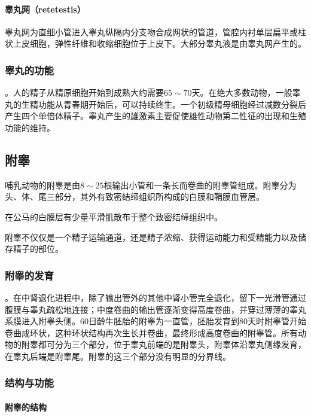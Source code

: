\paragraph{睾丸网（retetestis）}

睾丸网为直细小管进入睾丸纵隔内分支吻合成网状的管道，管腔内衬单层扁平或柱状上皮细胞，弹性纤维和收缩细胞位于上皮下。大部分睾丸液是由睾丸网产生的。

\subsubsection{睾丸的功能}

。人的精子从精原细胞开始到成熟大约需要$ 65\sim 70 $天。在绝大多数动物，一般睾丸的生精功能从青春期开始后，可以持续终生。一个初级精母细胞经过减数分裂后产生四个单倍体精子。睾丸产生的雄激素主要促使雄性动物第二性征的出现和生殖功能的维持。

\subsection{附睾}

哺乳动物的附睾是由$ 8\sim 25 $根输出小管和一条长而卷曲的附睾管组成。附睾分为头、体、尾三部分，其外有致密结缔组织所构成的白膜和鞘膜血管层。

在公马的白膜层有少量平滑肌散布于整个致密结缔组织中。

附睾不仅仅是一个精子运输通道，还是精子浓缩、获得运动能力和受精能力以及储存精子的部位。

\subsubsection{附睾的发育}

。在中肾退化进程中，除了输出管外的其他中肾小管完全退化，留下一光滑管通过腹膜与睾丸疏松地连接；中度卷曲的输出管逐渐变得高度卷曲，并穿过薄薄的睾丸系膜进入附睾头侧。60日龄牛胚胎的附睾为一直管，胚胎发育到80天时附睾管开始卷曲成环状，这种环状结构再次生长并卷曲，最终形成高度卷曲的附睾管。所有动物的附睾都可分为三个部分，位于睾丸前端的是附睾头，附睾体沿睾丸侧缘发育，在睾丸后端是附睾尾。附睾的这三个部分没有明显的分界线。

\subsubsection{结构与功能}

\paragraph{附睾的结构}

